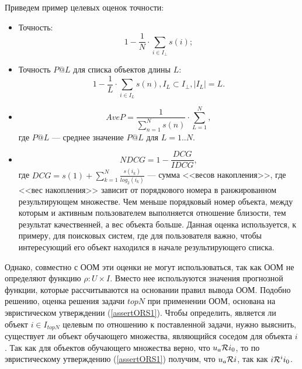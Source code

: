 Приведем пример целевых оценок точности:
\begin{itemize}
\item Точность:
	\begin{equation}
		\label{precision}
	1 - \frac{1}{N} \cdot \sum \limits_{i \in I_{\bot}} s(i);
	\end{equation}
\item Точность $P@L$ для списка объектов длины $L$:
\begin{equation}
1 - \frac{1}{L} \cdot \sum \limits_{i \in I_L} s(n),I_L \subset I_{\bot},
|I_L| = L.
\end{equation}
\item
	\begin{equation}
	AveP = \frac{1}{\sum \limits_{n=1}^{N} s(n)} \cdot
\sum \limits_{L=1}^{N},
\end{equation}
		где $P@L$ --- среднее значение $P@L$ для $L=1..N$.
	\item
		\begin{equation}
		NDCG = 1 - \frac{DCG}{IDCG},
		\end{equation}
			где $DCG = s(1) + \sum \limits_{k=1}^N
\frac{s(i_k)}{log_2(i_k)}$ --- сумма <<весов накопления>>,
где <<вес накопления>> зависит от порядкового номера
в ранжированном результирующем множестве.
Чем меньше порядковый номер объекта,
между которым и активным пользователем выполняется отношение
близости, тем результат качественней, а вес объекта больше.
		Данная оценка используется, к примеру, для поисковых систем\cite{},
		где для пользователя важно, чтобы интересующий его объект находился в
		начале результирующего списка.
\end{itemize}

Однако, совместно с ООМ эти оценки не могут использоваться, так как ООМ
не определяют функцию $\rho: U \times I$. Вместо нее используются значения
прогнозной функции, которые рассчитываются на основании правил вывода ООМ.
Подобно решению, оценка решения задачи $topN$ при применении ООМ,
основана на эвристическом утверждении (\ref{assertORS1}). Чтобы определить,
является ли объект $i \in I_{topN}$ целевым по отношению к поставленной задачи,
нужно выяснить, существует ли объект обучающего множества, являющийся соседом
для объекта $i$. Так как для объектов обучающего множества верно, что $u_a \mathcal{R}
i_0$, то по эвристическому утверждению (\ref{assertORS1}) получим, что $u_a \mathcal{R}
i$, так как $i \mathcal{R}^i i_0$.

